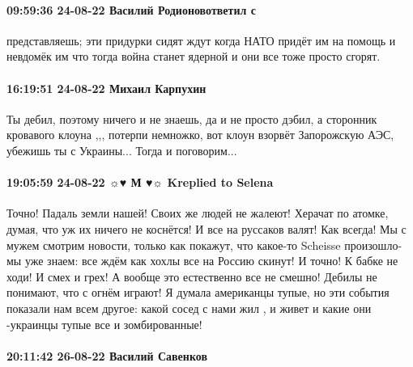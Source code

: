 \paragraph{09:59:36 24-08-22 Василий Родионовответил с}

представляешь; эти придурки сидят ждут когда НАТО придёт им на помощь и
невдомёк им что тогда война станет ядерной и они все тоже просто сгорят.


\paragraph{16:19:51 24-08-22 Михаил Карпухин}

Ты дебил, поэтому ничего и не знаешь, да и не просто дэбил, а сторонник
кровавого клоуна ,,, потерпи немножко, вот клоун взорвёт Запорожскую АЭС,
убежишь ты с Украины... Тогда и поговорим...


\paragraph{19:05:59 24-08-22 ☼♥ М ♥☼ Kreplied to Selena}

Точно!
Падаль земли нашей! Своих же людей не жалеют! Херачат по атомке, думая, что уж их ничего не коснётся!
И все на руссаков валят! Как всегда!
Мы с мужем смотрим новости, только как покажут, что какое-то Scheisse произошло-мы уже знаем: все ждём как хохлы все на Россию скинут! 
И точно! К бабке не ходи!
И смех и грех! А вообще это естественно все не смешно!
Дебилы не понимают, что с огнём играют! Я думала американцы тупые, но эти события показали нам всем другое: какой сосед с нами жил , и живет и какие они -украинцы тупые все и зомбированные!


\paragraph{20:11:42 26-08-22 Василий Савенков}

